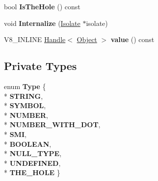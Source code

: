 \begin{DoxyCompactItemize}
\item 
bool {\bfseries Is\+The\+Hole} () const \hypertarget{classv8_1_1internal_1_1_ast_value_a9be486500221fc869fd176e8abdb5903}{}\label{classv8_1_1internal_1_1_ast_value_a9be486500221fc869fd176e8abdb5903}

\item 
void {\bfseries Internalize} (\hyperlink{classv8_1_1internal_1_1_isolate}{Isolate} $\ast$isolate)\hypertarget{classv8_1_1internal_1_1_ast_value_a71b8e2275ef7875e0ca7b48e4eaa2650}{}\label{classv8_1_1internal_1_1_ast_value_a71b8e2275ef7875e0ca7b48e4eaa2650}

\item 
V8\+\_\+\+I\+N\+L\+I\+NE \hyperlink{classv8_1_1internal_1_1_handle}{Handle}$<$ \hyperlink{classv8_1_1internal_1_1_object}{Object} $>$ {\bfseries value} () const \hypertarget{classv8_1_1internal_1_1_ast_value_a2c1bb2b42997f4dbc59919f38e013e09}{}\label{classv8_1_1internal_1_1_ast_value_a2c1bb2b42997f4dbc59919f38e013e09}

\end{DoxyCompactItemize}
\subsection*{Private Types}
\begin{DoxyCompactItemize}
\item 
enum {\bfseries Type} \{ \\*
{\bfseries S\+T\+R\+I\+NG}, 
\\*
{\bfseries S\+Y\+M\+B\+OL}, 
\\*
{\bfseries N\+U\+M\+B\+ER}, 
\\*
{\bfseries N\+U\+M\+B\+E\+R\+\_\+\+W\+I\+T\+H\+\_\+\+D\+OT}, 
\\*
{\bfseries S\+MI}, 
\\*
{\bfseries B\+O\+O\+L\+E\+AN}, 
\\*
{\bfseries N\+U\+L\+L\+\_\+\+T\+Y\+PE}, 
\\*
{\bfseries U\+N\+D\+E\+F\+I\+N\+ED}, 
\\*
{\bfseries T\+H\+E\+\_\+\+H\+O\+LE}
 \}\hypertarget{classv8_1_1internal_1_1_ast_value_abe695a8685558e5980a168732e63b152}{}\label{classv8_1_1internal_1_1_ast_value_abe695a8685558e5980a168732e63b152}

\end{DoxyCompactItemize}
